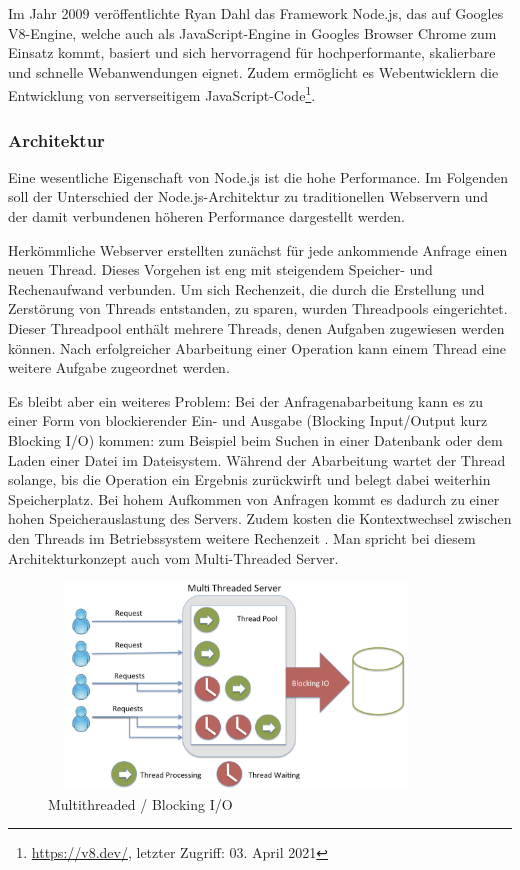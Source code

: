 Im Jahr 2009 veröffentlichte Ryan Dahl das Framework Node.js, das auf Googles V8-Engine, welche auch als JavaScript-Engine in Googles Browser Chrome zum Einsatz kommt, basiert und sich hervorragend für hochperformante, skalierbare und schnelle Webanwendungen eignet. Zudem ermöglicht es Webentwicklern die Entwicklung von serverseitigem JavaScript-Code\footnote{\url{https://v8.dev/}, letzter Zugriff: 03. April 2021}.


\subsubsection{Architektur}
Eine wesentliche Eigenschaft von Node.js ist die hohe Performance. Im Folgenden soll der Unterschied der Node.js-Architektur zu traditionellen Webservern und der damit verbundenen höheren Performance dargestellt werden.
\newline

\noindent
Herkömmliche Webserver erstellten zunächst für jede ankommende Anfrage einen neuen Thread. Dieses Vorgehen ist eng mit steigendem Speicher- und Rechenaufwand verbunden. Um sich Rechenzeit, die durch die Erstellung und Zerstörung von Threads entstanden, zu sparen, wurden Threadpools eingerichtet. Dieser Threadpool enthält mehrere Threads, denen Aufgaben zugewiesen werden können. Nach erfolgreicher Abarbeitung einer Operation kann einem Thread eine weitere Aufgabe zugeordnet werden.
\newline

\noindent
Es bleibt aber ein weiteres Problem: Bei der Anfragenabarbeitung kann es zu einer Form von blockierender Ein- und Ausgabe (Blocking Input/Output kurz Blocking I/O) kommen: zum Beispiel beim Suchen in einer Datenbank oder dem Laden einer Datei im Dateisystem.
 Während der Abarbeitung wartet der Thread solange, bis die Operation ein Ergebnis zurückwirft und belegt dabei weiterhin Speicherplatz. 
 Bei hohem Aufkommen von Anfragen kommt es dadurch zu einer hohen Speicherauslastung des Servers. Zudem kosten die Kontextwechsel zwischen den Threads im Betriebssystem weitere Rechenzeit \cite{Node1.05}. Man spricht bei diesem Architekturkonzept auch vom Multi-Threaded Server.
\newline

\begin{figure}[tbt]
\centering
\includegraphics[width=10cm, height = 5.5cm]{images/nodejs_otherthreading.png}
\caption[Multithreaded / Blocking I/O]{Multithreaded / Blocking I/O \cite{Node1.1}}
\end{figure}
 
